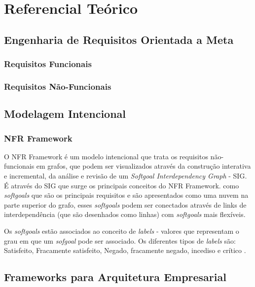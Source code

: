 \chapter[Referencial Teórico]{Referencial Teórico}

\section{Engenharia de Requisitos Orientada a Meta}

\subsection{Requisitos Funcionais}

\subsection{Requisitos Não-Funcionais}

\section{Modelagem Intencional}

\subsection{NFR Framework}

O NFR Framework é um modelo intencional que trata os requisitos não-funcionais em grafos, que podem ser visualizados através da construção interativa e incremental, da análise e revisão de um \textit{Softgoal Interdependency Graph} - SIG. É através do SIG que surge os principais conceitos do NFR Framework. como \textit{softgoals} que são os principais requisitos e são apresentados como uma nuvem na parte superior do grafo, esses \textit{softgoals} podem ser conectados através de links de interdependência (que são desenhados como linhas) com \textit{softgoals} mais flexíveis\cite{chung2012non}.

Os \textit{softgoals} estão associados ao conceito de \textit{labels} - valores que representam o grau em que um \textit{sofgoal} pode ser associado. Os diferentes tipos de \textit{labels} são: Satisfeito, Fracamente satisfeito, Negado, fracamente negado, incediso e crítico \cite{chung2012non}. 

\section{Frameworks para Arquitetura Empresarial}